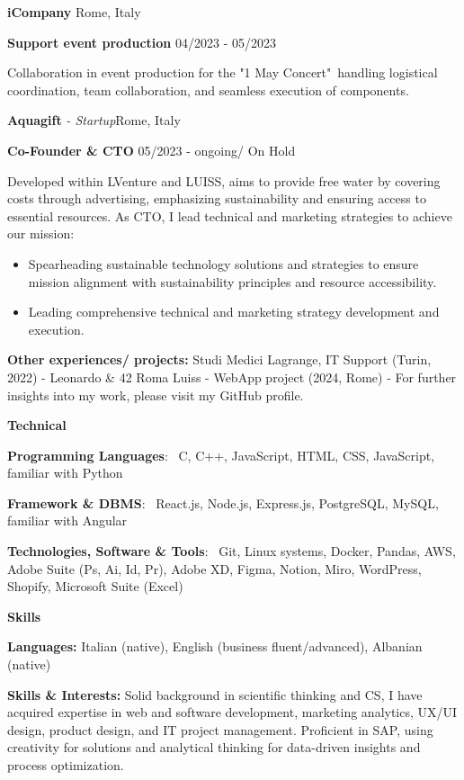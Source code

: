 \documentclass[11pt]{article}
\begin{document}
\vspace{12pt}

\textbf{iCompany} \hfill Rome, Italy

\textbf{Support event production} \hfill 04/2023 - 05/2023

Collaboration in event production for the "1 May Concert"\ handling logistical coordination, team collaboration, and seamless execution of components.
\vspace{12pt}

\textbf{Aquagift} \textit{- Startup}\hfill Rome, Italy

\textbf{Co-Founder \& CTO} \hfill 05/2023 - ongoing/ On Hold

Developed within LVenture and LUISS, aims to provide free water by covering costs through advertising, emphasizing sustainability and ensuring access to essential resources. As CTO, I lead technical and marketing strategies to achieve our mission:



\begin{itemize}[noitemsep,topsep=0pt]
    \item Spearheading sustainable technology solutions and strategies to ensure mission alignment with sustainability principles and resource accessibility.
    \item Leading comprehensive technical and marketing strategy development and execution.

\end{itemize}
\textbf{Other experiences/ projects:} Studi Medici Lagrange, IT Support (Turin, 2022) - Leonardo \& 42 Roma Luiss - WebApp project (2024, Rome)  - For further insights into my work, please visit my GitHub profile.\hfill

\begin{center}
    \textbf{Technical}
\end{center}

\textbf{Programming Languages}: \
C, C++, JavaScript, HTML, CSS, JavaScript, familiar with Python

\textbf{Framework \& DBMS}: \
React.js, Node.js, Express.js, PostgreSQL, MySQL, familiar with Angular

\textbf{Technologies, Software \& Tools}: \
Git, Linux systems, Docker, Pandas, AWS, Adobe Suite (Ps, Ai, Id, Pr), Adobe XD, Figma, Notion, Miro, WordPress, Shopify, Microsoft Suite (Excel)


\vspace{12pt}

\begin{center}
    \textbf{Skills}
\end{center}
\textbf{Languages:} Italian (native), English (business fluent/advanced), Albanian (native)

\textbf{Skills \& Interests:} Solid background in scientific thinking and CS, I have acquired expertise in web and software development, marketing analytics, UX/UI design, product design, and IT project management. Proficient in SAP, using creativity for solutions and analytical thinking for data-driven insights and process optimization.
\end{document}
